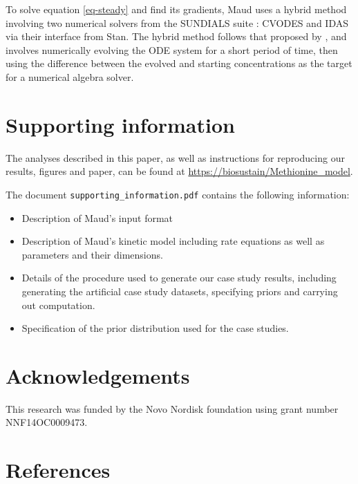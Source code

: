 \documentclass[journal=asbcd6,manuscript=article,layout=traditional]{achemso}
\providecommand{\tightlist}{%
  \setlength{\itemsep}{0pt}\setlength{\parskip}{0pt}}\usepackage{longtable,booktabs,array}
\begin{document}
To solve equation \eqref{eq-steady} and find its gradients, Maud uses a
hybrid method involving two numerical solvers from the SUNDIALS suite
\citep{serbanCVODESSensitivityEnabledODE2005}: CVODES and IDAS via their
interface from Stan. The hybrid method follows that proposed by
\citet{margossianComputingSteadyStates2018}, and involves numerically
evolving the ODE system for a short period of time, then using the
difference between the evolved and starting concentrations as the target
for a numerical algebra solver.

\hypertarget{supporting-information}{%
\section{Supporting information}\label{supporting-information}}

The analyses described in this paper, as well as instructions for
reproducing our results, figures and paper, can be found at
\url{https://biosustain/Methionine_model}.

The document \texttt{supporting\_information.pdf} contains the following
information:

\begin{itemize}
\tightlist
\item
  Description of Maud's input format
\item
  Description of Maud's kinetic model including rate equations as well
  as parameters and their dimensions.
\item
  Details of the procedure used to generate our case study results,
  including generating the artificial case study datasets, specifying
  priors and carrying out computation.
\item
  Specification of the prior distribution used for the case studies.
\end{itemize}

\hypertarget{acknowledgements}{%
\section{Acknowledgements}\label{acknowledgements}}

This research was funded by the Novo Nordisk foundation using grant
number NNF14OC0009473.

\hypertarget{references}{%
\section{References}\label{references}}

\renewcommand{\bibsection}{}

\end{document}
